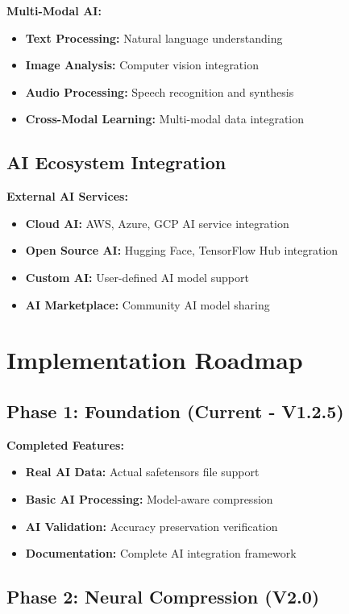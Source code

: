 \documentclass[12pt,a4paper]{article}
\begin{document}
\textbf{Multi-Modal AI:}
\begin{itemize}
    \item \textbf{Text Processing:} Natural language understanding
    \item \textbf{Image Analysis:} Computer vision integration
    \item \textbf{Audio Processing:} Speech recognition and synthesis
    \item \textbf{Cross-Modal Learning:} Multi-modal data integration
\end{itemize}

\subsection{AI Ecosystem Integration}

\textbf{External AI Services:}
\begin{itemize}
    \item \textbf{Cloud AI:} AWS, Azure, GCP AI service integration
    \item \textbf{Open Source AI:} Hugging Face, TensorFlow Hub integration
    \item \textbf{Custom AI:} User-defined AI model support
    \item \textbf{AI Marketplace:} Community AI model sharing
\end{itemize}

\section{Implementation Roadmap}

\subsection{Phase 1: Foundation (Current - V1.2.5)}

\textbf{Completed Features:}
\begin{itemize}
    \item \textbf{Real AI Data:} Actual safetensors file support
    \item \textbf{Basic AI Processing:} Model-aware compression
    \item \textbf{AI Validation:} Accuracy preservation verification
    \item \textbf{Documentation:} Complete AI integration framework
\end{itemize}

\subsection{Phase 2: Neural Compression (V2.0)}
\end{document}
